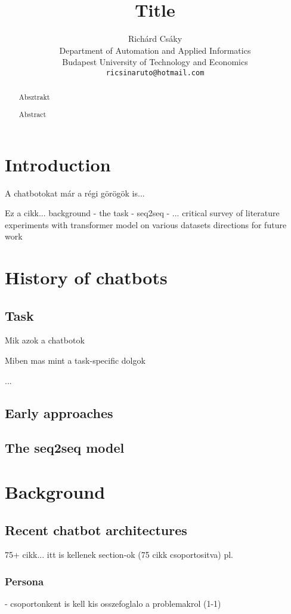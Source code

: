 \documentclass[11pt]{article}
\title{Title}
\author{ %
    Rich\'ard Cs\'aky \\
    Department of Automation and Applied Informatics \\
    Budapest University of Technology and Economics \\
    {\tt ricsinaruto@hotmail.com} \\
    }
\date{}
\begin{document}
\maketitle

\begin{abstract}
Absztrakt
\end{abstract}

\begin{abstract}
Abstract
\end{abstract}

\section{Introduction}
\label{sec:intro}

A chatbotokat már a régi görögök is...

Ez a cikk...
    background
        - the task
        - seq2seq
        - ...
    critical survey of literature
    experiments with transformer model on various datasets
    directions for future work


\section{History of chatbots}
\label{sec:background}

    \subsection{Task}
    Mik azok a chatbotok
    
    Miben mas mint a task-specific dolgok
    
    ...


    \subsection{Early approaches}

    \subsection{The seq2seq model}


\section{Background}

    \subsection{Recent chatbot architectures}
75+ cikk...
    \cite{Cho:2014}
    itt is kellenek section-ok (75 cikk csoportositva)
    pl. \subsubsection{Persona}
    - csoportonkent is kell kis osszefoglalo a problemakrol (1-1)
\end{document}
